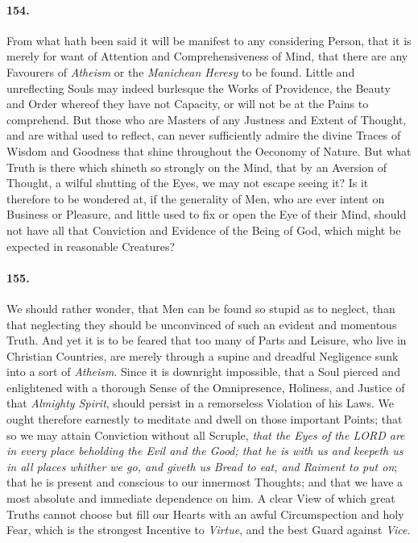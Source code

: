 \documentclass[]{article}
\newenvironment{sectionbody}{\begin{multicols}{2}}{\end{multicols}}
\begin{document}
\begin{sectionbody}
\paragraph{154.} From what hath been said it will be manifest to any considering
Person, that it is merely for want of Attention and
Comprehensiveness of Mind, that there are any Favourers of
\emph{Atheism} or the \emph{Manichean Heresy} to be found.
Little and unreflecting Souls may indeed burlesque the Works of
Providence, the Beauty and Order whereof they have not Capacity,
or will not be at the Pains to comprehend.  But those who are
Masters of any Justness and Extent of Thought, and are withal
used to reflect, can never sufficiently admire the divine Traces
of Wisdom and Goodness that shine throughout the Oeconomy of
Nature.  But what Truth is there which shineth so strongly on the
Mind, that by an Aversion of Thought, a wilful shutting of the
Eyes, we may not escape seeing it?  Is it therefore to be
wondered at, if the generality of Men, who are ever intent on
Business or Pleasure, and little used to fix or open the Eye of
their Mind, should not have all that Conviction and Evidence of
the Being of {\sc God}, which might be expected in reasonable
Creatures?



\paragraph{155.} We should rather wonder, that Men can be found so stupid as to
neglect, than that neglecting they should be unconvinced of such
an evident and momentous Truth.  And yet it is to be feared that
too many of Parts and Leisure, who live in Christian Countries,
are merely through a supine and dreadful Negligence sunk into a
sort of \emph{Atheism}.  Since it is downright impossible, that a
Soul pierced and enlightened with a thorough Sense of the
Omnipresence, Holiness, and Justice of that \emph{Almighty
Spirit}, should persist in a remorseless Violation of his Laws.
We ought therefore earnestly to meditate and dwell on those
important Points; that so we may attain Conviction without all
Scruple, \emph{that the Eyes of the LORD are in every place
beholding the Evil and the Good; that he is with us and keepeth
us in all places whither we go, and giveth us Bread to eat, and
Raiment to put on}; that he is present and conscious to our
innermost Thoughts; and that we have a most absolute and
immediate dependence on him.  A clear View of which great Truths
cannot choose but fill our Hearts with an awful Circumspection
and holy Fear, which is the strongest Incentive to \emph{Virtue},
and the best Guard against \emph{Vice}.




\end{sectionbody}
\end{document}
